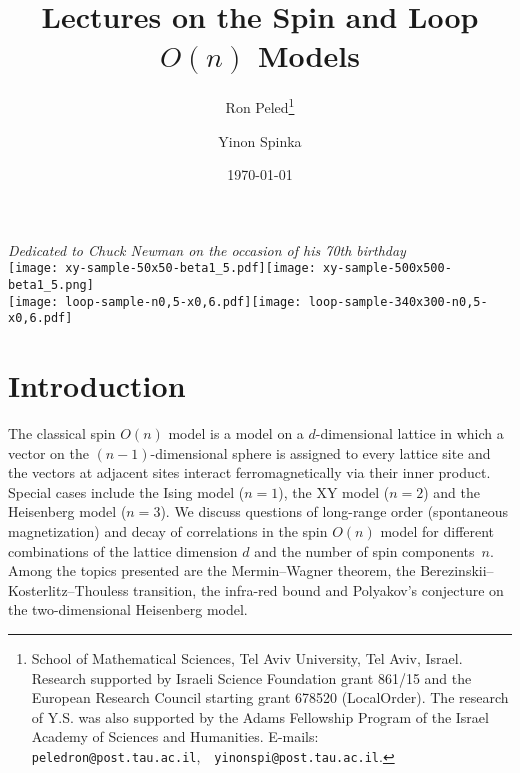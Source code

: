 \documentclass[12pt,reqno]{article}
\begin{document}
\title{Lectures on the Spin and Loop $O(n)$ Models}
\author{Ron Peled\thanks{School of Mathematical Sciences, Tel Aviv University, Tel Aviv, Israel. Research supported by Israeli Science Foundation grant 861/15 and the European Research Council starting grant 678520 (LocalOrder). The research of Y.S. was also supported by the Adams Fellowship Program of the Israel Academy of Sciences and Humanities. E-mails: {\tt peledron@post.tau.ac.il},\ \ {\tt yinonspi@post.tau.ac.il}.}\and Yinon Spinka\footnotemark[1]}

\date{\small{\today}}

\maketitle


\begin{center}
	\vspace{-20pt}
	\footnotesize{\textit{Dedicated to Chuck Newman on the occasion of his 70th birthday}}
	\vspace{20pt}\\
	\texttt{[image: xy-sample-50x50-beta1\_5.pdf]}\quad\texttt{[image: xy-sample-500x500-beta1\_5.png]}\\\bigbreak
	\texttt{[image: loop-sample-n0,5-x0,6.pdf]}\quad\texttt{[image: loop-sample-340x300-n0,5-x0,6.pdf]}
\end{center}

\newpage

\tableofcontents

\section{Introduction}
The classical spin $O(n)$ model is a model on a $d$-dimensional
lattice in which a vector on the $(n-1)$-dimensional sphere is
assigned to every lattice site and the vectors at adjacent sites
interact ferromagnetically via their inner product. Special cases
include the Ising model ($n=1$), the XY model ($n=2$) and the
Heisenberg model ($n=3$). We discuss questions of long-range order
(spontaneous magnetization) and decay of correlations in the spin
$O(n)$ model for different combinations of the lattice dimension $d$
and the number of spin components~$n$. Among the topics presented
are the Mermin--Wagner theorem, the Berezinskii--Kosterlitz--Thouless
transition, the infra-red bound and Polyakov's conjecture on the
two-dimensional Heisenberg model.
\end{document}
